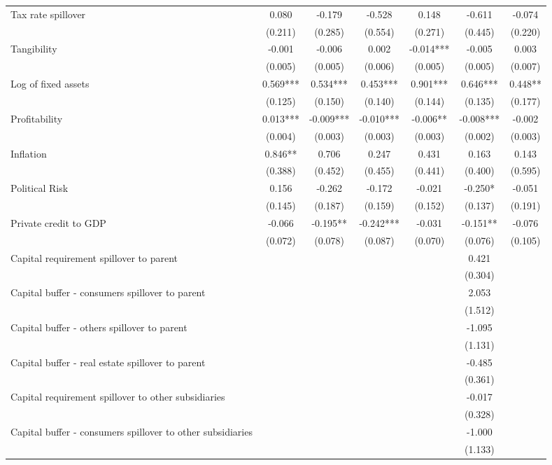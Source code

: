 \begin{tabular}{lcccccc}
Tax rate spillover & 0.080 & -0.179 & -0.528 & 0.148 & -0.611 & -0.074 \\
 & (0.211) & (0.285) & (0.554) & (0.271) & (0.445) & (0.220) \\
Tangibility & -0.001 & -0.006 & 0.002 & -0.014*** & -0.005 & 0.003 \\
 & (0.005) & (0.005) & (0.006) & (0.005) & (0.005) & (0.007) \\
Log of fixed assets & 0.569*** & 0.534*** & 0.453*** & 0.901*** & 0.646*** & 0.448** \\
 & (0.125) & (0.150) & (0.140) & (0.144) & (0.135) & (0.177) \\
Profitability & 0.013*** & -0.009*** & -0.010*** & -0.006** & -0.008*** & -0.002 \\
 & (0.004) & (0.003) & (0.003) & (0.003) & (0.002) & (0.003) \\
Inflation & 0.846** & 0.706 & 0.247 & 0.431 & 0.163 & 0.143 \\
 & (0.388) & (0.452) & (0.455) & (0.441) & (0.400) & (0.595) \\
Political Risk & 0.156 & -0.262 & -0.172 & -0.021 & -0.250* & -0.051 \\
 & (0.145) & (0.187) & (0.159) & (0.152) & (0.137) & (0.191) \\
Private credit to GDP & -0.066 & -0.195** & -0.242*** & -0.031 & -0.151** & -0.076 \\
 & (0.072) & (0.078) & (0.087) & (0.070) & (0.076) & (0.105) \\
Capital requirement spillover to parent &  &  &  &  & 0.421 &  \\
 &  &  &  &  & (0.304) &  \\
Capital buffer - consumers spillover to parent &  &  &  &  & 2.053 &  \\
 &  &  &  &  & (1.512) &  \\
Capital buffer - others spillover to parent &  &  &  &  & -1.095 &  \\
 &  &  &  &  & (1.131) &  \\
Capital buffer - real estate spillover to parent &  &  &  &  & -0.485 &  \\
 &  &  &  &  & (0.361) &  \\
Capital requirement spillover to other subsidiaries &  &  &  &  & -0.017 &  \\
 &  &  &  &  & (0.328) &  \\
Capital buffer - consumers spillover to other subsidiaries &  &  &  &  & -1.000 &  \\
 &  &  &  &  & (1.133) &  \\

\end{tabular}
